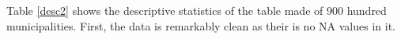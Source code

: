 \subsection{}

Table \ref{desc2} shows the descriptive statistics of the table made of
900 hundred municipalities. First, the data is remarkably clean as their is no
NA values in it.


